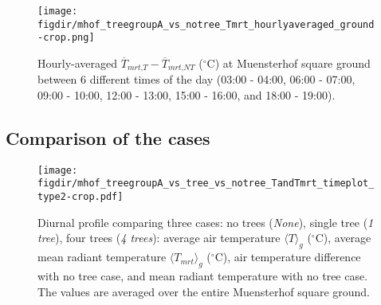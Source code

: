 \begin{figure}[t]
	\centering
	\texttt{[image: \\figdir/mhof\_treegroupA\_vs\_notree\_Tmrt\_hourlyaveraged\_ground-crop.png]}
	\caption{Hourly-averaged $\overline{T}_{\textit{mrt,T}}-\overline{T}_{\textit{mrt,NT}}$ ($^{\circ}$C) at Muensterhof square ground between 6 different times of the day (03:00 - 04:00, 06:00 - 07:00, 09:00 - 10:00, 12:00 - 13:00, 15:00 - 16:00, and 18:00 - 19:00).}
	\label{fig:mTmrtdiff_muensterhof}
\end{figure}


\subsection{Comparison of the cases}

\begin{figure}[t]
	\centering
	\texttt{[image: \\figdir/mhof\_treegroupA\_vs\_tree\_vs\_notree\_TandTmrt\_timeplot\_type2-crop.pdf]}
	\caption{Diurnal profile comparing three cases: no trees (\textit{None}), single tree (\textit{1 tree}), four trees (\textit{4 trees}):  average air temperature $\langle T\rangle_g$ ($^{\circ}$C),  average mean radiant temperature $\langle \textit{T}_{\textit{mrt}}\rangle_g$ ($^{\circ}$C),  air temperature difference with no tree case, and  mean radiant temperature with no tree case. The values are averaged over the entire Muensterhof square ground.}
	\label{fig:mhofprofile_T_Tmrt}
\end{figure}

